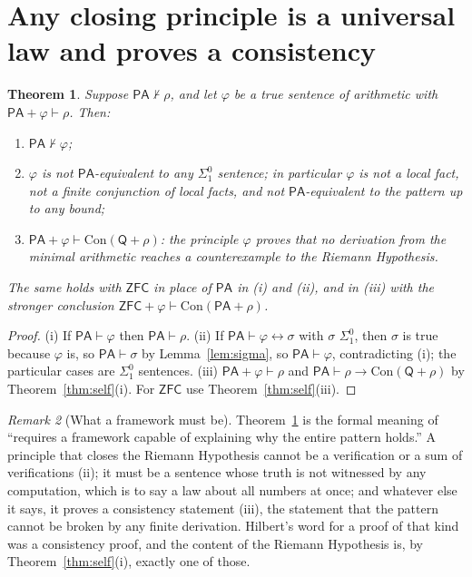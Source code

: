 \documentclass[11pt]{article}
\newtheorem{theorem}{Theorem}[section]
\theoremstyle{definition}
\theoremstyle{remark}
\newtheorem{remark}[theorem]{Remark}
\newcommand{\PA}{\mathsf{PA}}
\newcommand{\ZFC}{\mathsf{ZFC}}
\newcommand{\RA}{\mathsf{Q}}
\newcommand{\Con}{\mathrm{Con}}
\newcommand{\Sigone}{\Sigma^0_1}
\begin{document}
\section{Any closing principle is a universal law and proves a consistency}

\begin{theorem}\label{thm:global}
Suppose $\PA\nvdash\rho$, and let $\varphi$ be a true sentence of arithmetic with $\PA+\varphi\vdash\rho$. Then:
\begin{enumerate}
\item[(i)] $\PA\nvdash\varphi$;
\item[(ii)] $\varphi$ is not $\PA$-equivalent to any $\Sigone$ sentence; in particular $\varphi$ is not a local fact, not a finite conjunction of local facts, and not $\PA$-equivalent to the pattern up to any bound;
\item[(iii)] $\PA+\varphi\vdash\Con(\RA+\rho)$: the principle $\varphi$ proves that no derivation from the minimal arithmetic reaches a counterexample to the Riemann Hypothesis.
\end{enumerate}
The same holds with $\ZFC$ in place of $\PA$ in (i) and (ii), and in (iii) with the stronger conclusion $\ZFC+\varphi\vdash\Con(\PA+\rho)$.
\end{theorem}

\begin{proof}
(i) If $\PA\vdash\varphi$ then $\PA\vdash\rho$. (ii) If $\PA\vdash\varphi\leftrightarrow\sigma$ with $\sigma$ $\Sigone$, then $\sigma$ is true because $\varphi$ is, so $\PA\vdash\sigma$ by Lemma~\ref{lem:sigma}, so $\PA\vdash\varphi$, contradicting (i); the particular cases are $\Sigone$ sentences. (iii) $\PA+\varphi\vdash\rho$ and $\PA\vdash\rho\to\Con(\RA+\rho)$ by Theorem~\ref{thm:self}(i). For $\ZFC$ use Theorem~\ref{thm:self}(iii).
\end{proof}

\begin{remark}[What a framework must be]
Theorem~\ref{thm:global} is the formal meaning of ``requires a framework capable of explaining why the entire pattern holds.'' A principle that closes the Riemann Hypothesis cannot be a verification or a sum of verifications (ii); it must be a sentence whose truth is not witnessed by any computation, which is to say a law about all numbers at once; and whatever else it says, it proves a consistency statement (iii), the statement that the pattern cannot be broken by any finite derivation. Hilbert's word for a proof of that kind was a consistency proof, and the content of the Riemann Hypothesis is, by Theorem~\ref{thm:self}(i), exactly one of those.
\end{remark}
\end{document}
